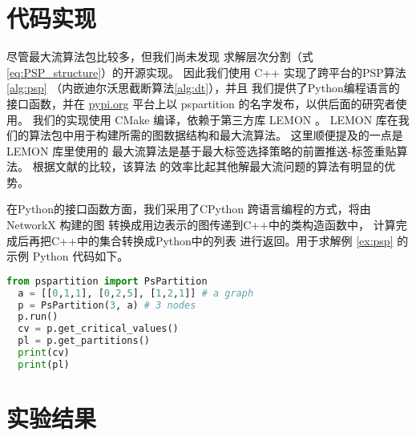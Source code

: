 \section{代码实现}
尽管最大流算法包比较多，但我们尚未发现
求解层次分割（式\eqref{eq:PSP_structure}）的开源实现。
因此我们使用 C++ 实现了跨平台的PSP算法\ref{alg:psp}
（内嵌迪尔沃思截断算法\ref{alg:dt}），并且
我们提供了Python编程语言的接口函数，并在 \url{pypi.org}
平台上以 pspartition
的名字发布，以供后面的研究者使用。
我们的实现使用 CMake 编译，依赖于第三方库 LEMON \cite{dezsHo2011lemon}。 
LEMON 库在我们的算法包中用于构建所需的图数据结构和最大流算法。
这里顺便提及的一点是 LEMON 库里使用的
最大流算法是基于最大标签选择策略的前置推送-标签重贴算法。
根据文献\citet{ahuja1997computational}的比较，该算法
的效率比起其他解最大流问题的算法有明显的优势。

在Python的接口函数方面，我们采用了CPython
跨语言编程的方式，将由 NetworkX \cite{SciPyProceedings_11} 构建的图
转换成用边表示的图传递到C++中的类构造函数中，
计算完成后再把C++中的集合转换成Python中的列表
进行返回。用于求解例 \ref{ex:psp}
的示例 Python 代码如下。
\begin{lstlisting}[language=Python]
  from pspartition import PsPartition
  a = [[0,1,1], [0,2,5], [1,2,1]] # a graph
  p = PsPartition(3, a) # 3 nodes
  p.run()  
  cv = p.get_critical_values()
  pl = p.get_partitions()
  print(cv)
  print(pl)
  \end{lstlisting}
\section{实验结果}


